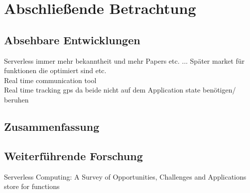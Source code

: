 \documentclass[11pt]{article}
\begin{document}
\section{Abschließende Betrachtung}
\subsection{Absehbare Entwicklungen}
\cite{al2019systematic} Serverless  immer mehr bekanntheit und mehr Papers etc. ... Später market für funktionen die optimiert sind etc. \cite{shafiei2020serverless}\\
Real time communication tool  \cite{shafiei2020serverless} \\
Real time tracking gps  \cite{shafiei2020serverless} da beide nicht auf dem Application state benötigen/ beruhen  \cite{shafiei2020serverless} \\
\cite{hellerstein2018serverless}
\subsection{Zusammenfassung}
\subsection{Weiterführende Forschung}
Serverless Computing: A Survey of Opportunities, Challenges and Applications store for functions
\cite{shahrad2019architectural}
\newpage
\printbibliography[title={Literaturverzeichnis}]
\end{document}
